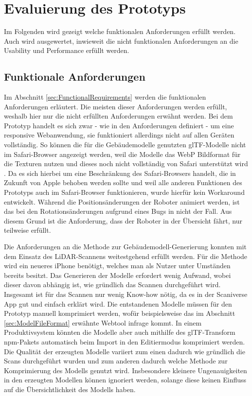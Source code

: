 \newpage
\section{Evaluierung des Prototyps}
Im Folgenden wird gezeigt welche funktionalen Anforderungen erfüllt werden. Auch wird ausgewertet, inwieweit die nicht funktionalen Anforderungen an die Usability und Performance erfüllt werden.

\subsection{Funktionale Anforderungen}\label{sec:EvaluationFunctionalRequirements}
Im Abschnitt \ref{sec:FunctionalRequirements} werden die funktionalen Anforderungen erläutert. Die meisten dieser Anforderungen werden erfüllt, weshalb hier nur die nicht erfüllten Anforderungen erwähnt werden. Bei dem Prototyp handelt es sich zwar - wie in den Anforderungen definiert - um eine responsive Webanwendung, sie funktioniert allerdings nicht auf allen Geräten vollständig. So können die für die Gebäudemodelle genutzten \ac{glTF}-Modelle nicht im Safari-Browser angezeigt werden, weil die Modelle das \ac{WebP} Bildformat für die Texturen nutzen und dieses noch nicht vollständig von Safari unterstützt wird \cite{CanIUseWebP}. Da es sich hierbei um eine Beschränkung des Safari-Browsers handelt, die in Zukunft von Apple behoben werden sollte und weil alle anderen Funktionen des Prototyps auch im Safari-Browser funktionieren, wurde hierfür kein Workaround entwickelt. Während die Positionsänderungen der Roboter animiert werden, ist das bei den Rotationsänderungen aufgrund eines Bugs in \deckgl{} nicht der Fall. Aus diesem Grund ist die Anforderung, dass der Roboter in der Übersicht fährt, nur teilweise erfüllt.

Die Anforderungen an die Methode zur Gebäudemodell-Generierung konnten mit dem Einsatz des \ac{LiDAR}-Scannens weitestgehend erfüllt werden. Für die Methode wird ein neueres iPhone benötigt, welches man als Nutzer unter Umständen bereits besitzt. Das Generieren der Modelle erfordert wenig Aufwand, wobei dieser davon abhängig ist, wie gründlich das Scannen durchgeführt wird. Insgesamt ist für das Scannen nur wenig Know-how nötig, da es in der Scaniverse App gut und einfach erklärt wird. Die entstandenen Modelle müssen für den Prototyp manuell komprimiert werden, wofür beispielsweise das im Abschnitt \ref{sec:ModelFileFormat} erwähnte Webtool infrage kommt. In einem Produktivsystem könnten die Modelle aber auch mithilfe des \ac{glTF}-Transform \ac{npm}-Pakets \cite{glTF-Transform} automatisch beim Import in den Editiermodus komprimiert werden. Die Qualität der erzeugten Modelle variiert zum einen dadurch wie gründlich die Scans durchgeführt wurden und zum anderen dadurch welche Methode zur Komprimierung des Modells genutzt wird. Insbesondere kleinere Ungenauigkeiten in den erzeugten Modellen können ignoriert werden, solange diese keinen Einfluss auf die Übersichtlichkeit des Modells haben.

